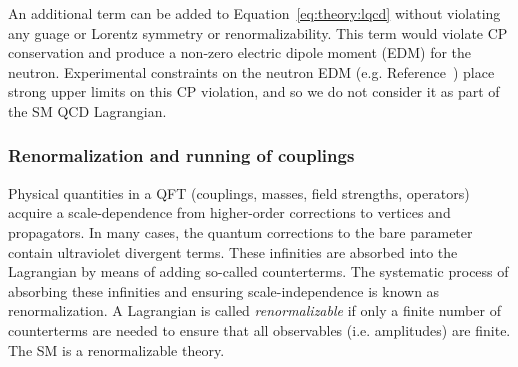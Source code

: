 An additional term can be added to Equation~\ref{eq:theory:lqcd} without violating any guage or Lorentz symmetry or renormalizability.
This term would violate CP conservation and produce a non-zero electric dipole moment (EDM) for the neutron.
Experimental constraints on the neutron EDM (e.g. Reference~\cite{nedm1}) place strong upper limits on this CP violation, and so we do not consider it as part of the SM QCD Lagrangian. 

\subsubsection{Renormalization and running of couplings}

Physical quantities in a QFT (couplings, masses, field strengths, operators) acquire a scale-dependence from higher-order corrections to vertices and propagators. 
In many cases, the quantum corrections to the bare parameter contain ultraviolet divergent terms.
These infinities are absorbed into the Lagrangian by means of adding so-called counterterms. 
The systematic process of absorbing these infinities and ensuring scale-independence is known as renormalization.
A Lagrangian is called \emph{renormalizable} if only a finite number of counterterms are needed to ensure that all observables (i.e. amplitudes) are finite. 
The SM is a renormalizable theory.

